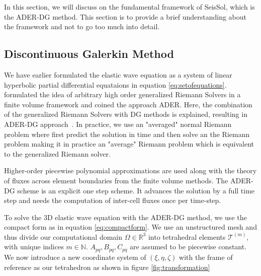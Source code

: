 In this section, we will discuss on the fundamental framework of SeisSol, which is the \ac{ADER}-\ac{DG} method. This section is to provide
a brief understanding about the framework and not to go too much into detail. 


\subsection[Discontinuous Galerkin method]{Discontinuous Galerkin Method}\label{subsection:DG}

We have earlier formulated the elastic wave equation as a system of linear hyperbolic partial differential equataions in equation \ref{eq:setofequations}.~
\parencite{Toro2001} formulated the idea of arbitrary high order generalized
Riemann Solvers in a finite volume framework and coined the approach \ac{ADER}. Here, the combination of the generalized Riemann Solvers with \ac{DG}
methods is explained, resulting in \ac{ADER}-\ac{DG} approach~\parencite{Dumbser2006}. In practice, we use an "averaged" normal Riemann problem where first predict
the solution in time and then solve an the Riemann problem making it in practice an "average" Riemann problem which is equivalent to the generalized Riemann solver.
\par Higher-order piecewise polynomial approximations are used
along with the theory of fluxes across element boundaries from the finite volume methods. The \ac{ADER}-\ac{DG} scheme is an explicit one step scheme.
It advances the solution by a full time step and needs the computation of inter-cell fluxes once per time-step.

To solve the 3D elastic wave equation with the \ac{ADER}-\ac{DG} method, we use the compact form as in equation \ref{eq:compactform}.
We use an unstructured mesh and thus divide our computational domain $\Omega \in \mathbb{R}^3$ into tetrahedral elements 
$\mathcal{T}^{\left(m\right)}$, with unique indices $m\in\mathbb{N}$. $A_{pq}, B_{pq}, C_{pq}$ are assumed to be piecewise constant. 
We now introduce a new coordinate system of $\left(\xi, \eta, \zeta \right)$ with the frame of reference as our tetrahedron as shown 
in figure \ref{fig:transformation} \\

